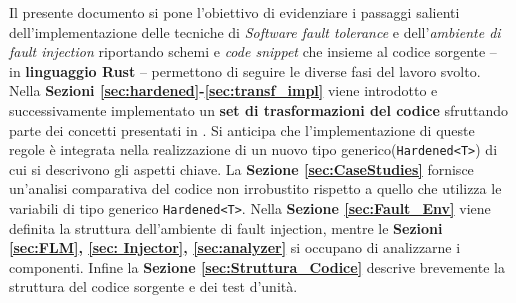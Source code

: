 \noindent 
Il presente documento si pone l'obiettivo di evidenziare i passaggi salienti dell'implementazione delle tecniche di \textit{Software fault tolerance} e dell'\textit{ambiente di fault injection} riportando schemi e \textit{code snippet}  che insieme al codice sorgente -- in \textbf{linguaggio Rust} -- permettono di seguire le diverse fasi del lavoro svolto.\\
Nella \textbf{Sezioni \ref{sec:hardened}-\ref{sec:transf_impl}} viene introdotto e successivamente implementato un \textbf{set di trasformazioni del codice} sfruttando parte dei concetti presentati in \cite{rebaudengo1999soft}. Si anticipa che l'implementazione di queste regole è integrata nella realizzazione di un nuovo tipo generico(\texttt{Hardened<T>}) di cui si descrivono gli aspetti chiave. La \textbf{Sezione \ref{sec:CaseStudies}} fornisce un'analisi comparativa del codice non irrobustito rispetto a quello che utilizza le variabili di tipo generico \texttt{Hardened<T>}. Nella \textbf{Sezione \ref{sec:Fault_Env}} viene definita la struttura dell'ambiente di fault injection, mentre le \textbf{Sezioni \ref{sec:FLM}, \ref{sec: Injector}, \ref{sec:analyzer}} si occupano di analizzarne i componenti. Infine la \textbf{Sezione \ref{sec:Struttura_Codice}} descrive brevemente la struttura del codice sorgente e dei test d'unità.
